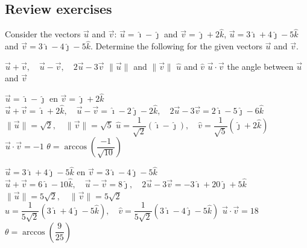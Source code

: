 \subsection*{Review exercises}
\begin{Exercise} Consider the vectors $\vec{u}$ and $\vec{v}$: 
			\Question $\vec{u} = \hat{\imath} - \hat{\jmath}$ \quad and \quad $\vec{v} = \hat{\jmath} + 2\hat{k}$, 
			\Question $\vec{u} = 3\hat{\imath} + 4\hat{\jmath} - 5\hat{k}$ \quad and \quad $\vec{v} = 3\hat{\imath} - 4\hat{\jmath} - 5\hat{k}$. 
			\EndCurrentQuestion
	Determine the following for the given vectors $\vec{u}$ and $\vec{v}$.
	\begin{multicols}{2}	
		\Question[difficulty = 1] $\vec{u} +  \vec{v}, \quad \vec{u} -  \vec{v}, \quad 2\vec{u} - 3\vec{v} $
		\Question[difficulty = 1] $\| \vec{u} \| $ and $\| \vec{v} \| $
		\Question[difficulty = 1] $\hat{u} $ and $\hat{v} $
		\Question[difficulty = 1]$ \vec{u} \cdot \vec{v}$
		\Question[difficulty = 1] the angle between $\vec{u}$ and $\vec{v}$
		\EndCurrentQuestion
	\end{multicols}

\end{Exercise}

\begin{Answer}\phantom{}
    
    \Question $\vec{u} = \hat{\imath} - \hat{\jmath}$ \quad en \quad $\vec{v} = \hat{\jmath} + 2\hat{k}$ 
    	\subQuestion $\vec{u} +  \vec{v} = \hat{\imath} + 2 \hat{k},\quad \vec{u} -  \vec{v} = \hat{\imath} - 2\hat{\jmath}-2\hat{k}, \quad 2\vec{u} - 3\vec{v} = 2\hat{\imath} - 5\hat{\jmath}-6\hat{k} $
    		\subQuestion $\| \vec{u} \| = \sqrt{2}, \quad \| \vec{v} \| = \sqrt{5} $ 
    		\subQuestion $\hat{u} =  \dfrac{1}{\sqrt{2}} \left( \hat{\imath} - \hat{\jmath} \right), \quad \hat{v} =  \dfrac{1}{\sqrt{5}} \left( \hat{\jmath} + 2\hat{k} \right)$
    		\subQuestion $ \vec{u} \cdot \vec{v}= -1$
    		\subQuestion $ \theta = \arccos \left( \dfrac{-1}{\sqrt{10}} \right) $
 
    	
    \Question $\vec{u} = 3\hat{\imath} + 4\hat{\jmath} - 5\hat{k}$ \quad en \quad $\vec{v} = 3\hat{\imath} - 4\hat{\jmath} - 5\hat{k}$
    	\subQuestion $\vec{u} +  \vec{v} = 6\hat{\imath} -10 \hat{k},\quad \vec{u} -  \vec{v} = 8\hat{\jmath}, \quad 2\vec{u} - 3\vec{v} = -3\hat{\imath} +20\hat{\jmath}+5\hat{k} $
    		\subQuestion $\| \vec{u} \| = 5\sqrt{2}, \quad \| \vec{v} \| = 5\sqrt{2} $ 
    		\subQuestion $\hat{u} =  \dfrac{1}{5\sqrt{2}} \left( 3\hat{\imath} + 4\hat{\jmath} - 5\hat{k} \right), \quad \hat{v} = \dfrac{1}{5\sqrt{2}} \left( 3\hat{\imath} - 4\hat{\jmath} - 5\hat{k} \right)$
    		\subQuestion $ \vec{u} \cdot \vec{v}= 18$
    		\subQuestion $ \theta = \arccos \left( \dfrac{9}{25} \right) $
 
\end{Answer}


\fi %

